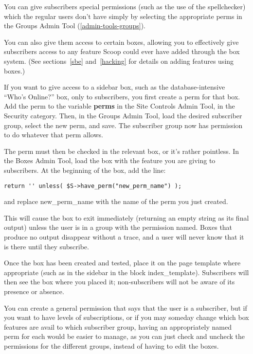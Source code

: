 You can give subscribers special permissions (such as the use of the spellchecker) which the regular users don't have simply by selecting the appropriate perms in the Groups Admin Tool (\ref{admin-tools-groups}).

You can also give them access to certain boxes, allowing you to effectively give subscribers access to any feature Scoop could ever have added through the box system.  (See sections~\ref{sbe} and~\ref{hacking} for details on adding features using boxes.)

If you want to give access to a sidebar box, such as the database-intensive ``Who's Online?'' box, only to subscribers, you first create a perm for that box.  Add the perm to the variable {\bf perms} in the Site Controls Admin Tool, in the Security category.  Then, in the Groups Admin Tool, load the desired subscriber group, select the new perm, and save.  The subscriber group now has permission to do whatever that perm allows.

The perm must then be checked in the relevant box, or it's rather pointless.  In the Boxes Admin Tool, load the box with the feature you are giving to subscribers.  At the beginning of the box, add the line:

\begin{verbatim}
return '' unless( $S->have_perm("new_perm_name") );
\end{verbatim}

and replace new\_perm\_name with the name of the perm you just created.

This will cause the box to exit immediately (returning an empty string as its final output) unless the user is in a group with the permission named.  Boxes that produce no output disappear without a trace, and a user will never know that it is there until they subscribe.

Once the box has been created and tested, place it on the page template where appropriate (such as in the sidebar in the block index\_template).  Subscribers will then see the box where you placed it; non-subscribers will not be aware of its presence or absence.

You can create a general permission that says that the user is a subscriber, but if you want to have levels of subscriptions, or if you may someday change which box features are avail to which subscriber group, having an appropriately named perm for each would be easier to manage, as you can just check and uncheck the permissions for the different groups, instead of having to edit the boxes.

